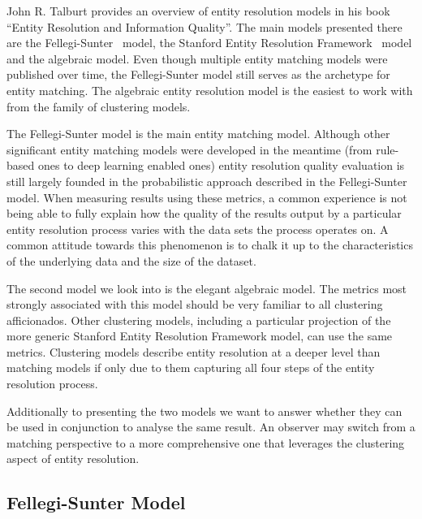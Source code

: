 \documentclass[journal]{IEEEtran}
\begin{document}
    John R. Talburt provides an overview of entity resolution models in his book
    ``Entity Resolution and Information Quality''\cite{Tal11}.
    The main models presented there are the Fellegi-Sunter~\cite{fs1969} model,
    the Stanford Entity Resolution Framework~\cite{Ben2009Swoosh} model and the
    algebraic\cite{tal2007algebraic} model.
    Even though multiple entity matching models were published over time, the
    Fellegi-Sunter model still serves as the archetype for entity matching.
    The algebraic entity resolution model is the easiest to work with from the
    family of clustering models.

    The Fellegi-Sunter model is the main entity matching model.
    Although other significant entity matching models were developed in the
    meantime (from rule-based ones to deep learning enabled ones) entity
    resolution quality evaluation is still largely founded in the probabilistic
    approach described in the Fellegi-Sunter model.
    When measuring results using these metrics, a common experience is not being
    able to fully explain how the quality of the results output by a particular
    entity resolution process varies with the data sets the process operates on.
    A common attitude towards this phenomenon is to chalk it up to the
    characteristics of the underlying data and the size of the dataset.
    
    The second model we look into is the elegant algebraic model.
    The metrics most strongly associated with this model should be very familiar
    to all clustering afficionados.
    Other clustering models, including a particular projection of the more
    generic Stanford Entity Resolution Framework model, can use the same
    metrics.
    Clustering models describe entity resolution at a deeper level than matching
    models if only due to them capturing all four steps of the entity resolution
    process.

    Additionally to presenting the two models we want to answer whether they can
    be used in conjunction to analyse the same result.
    An observer may switch from a matching perspective to a more comprehensive
    one that leverages the clustering aspect of entity resolution.

    \subsection{Fellegi-Sunter Model}\label{subsec:Fellegi-Sunter Model}
    
\end{document}
